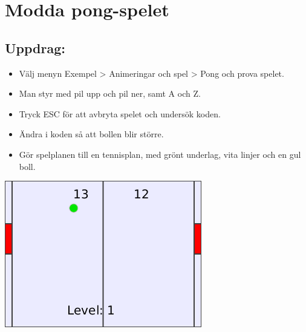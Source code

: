 \chapter{Modda pong-spelet}
\begin{multicols}{2}
\section*{\color{BrickRed}Uppdrag:}


\begin{itemize}

\item {Välj menyn Exempel > Animeringar och spel > Pong och prova spelet.}
\item {Man styr med pil upp och pil ner, samt A och Z.}
\item {Tryck ESC för att avbryta spelet och undersök koden.}
\item {Ändra i koden så att bollen blir större.}
\item {Gör spelplanen till en tennisplan, med grönt underlag, vita linjer och en gul boll.}

\end{itemize}



\columnbreak

\begin{center}
\includegraphics{../img/pong.png}
\end{center}

\end{multicols}

